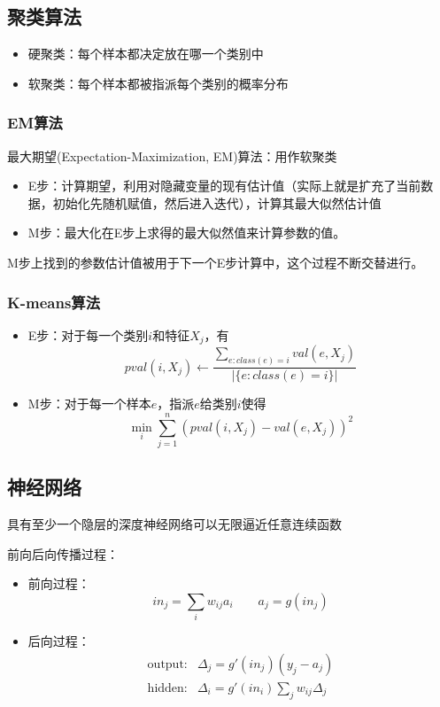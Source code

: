\subsection{聚类算法}
\begin{itemize}
	\item 硬聚类：每个样本都决定放在哪一个类别中
	\item 软聚类：每个样本都被指派每个类别的概率分布
\end{itemize}

\subsubsection{EM算法}
最大期望(Expectation-Maximization, EM)算法：用作软聚类
\begin{itemize}
	\item E步：计算期望，利用对隐藏变量的现有估计值（实际上就是扩充了当前数据，初始化先随机赋值，然后进入迭代），计算其最大似然估计值
	\item M步：最大化在E步上求得的最大似然值来计算参数的值。
\end{itemize}
M步上找到的参数估计值被用于下一个E步计算中，这个过程不断交替进行。

\subsubsection{K-means算法}
\begin{itemize}
	\item E步：对于每一个类别$i$和特征$X_j$，有
	\[pval(i,X_j)\gets\frac{\sum_{e:class(e)=i}val(e,X_j)}{|\{e:class(e)=i\}|}\]
	\item M步：对于每一个样本$e$，指派$e$给类别$i$使得
	\[\min_i\sum_{j=1}^n(pval(i,X_j)-val(e,X_j))^2\]
\end{itemize}

\subsection{神经网络}
\begin{theorem}
具有至少一个隐层的深度神经网络可以无限逼近任意连续函数
\end{theorem}

前向后向传播过程：
\begin{itemize}
	\item 前向过程：
	\[in_j=\sum_i w_{ij}a_i\qquad a_j=g(in_j)\]
	\item 后向过程：
	\[\begin{aligned}
	\text{output:} & \Delta_j=g'(in_j)(y_j-a_j)\\
	\text{hidden:} & \Delta_i=g'(in_i)\sum_j w_{ij}\Delta_j
	\end{aligned}\]
\end{itemize}

